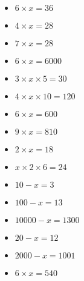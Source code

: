 \documentclass[a4paper,15pt]{exam}
\begin{document}
\begin{multicols}{2}
\begin{itemize}

\item $ 6 \times x = 36 $ 
\item $ 4 \times x = 28 $ 
\item $ 7 \times x = 28 $ 
\item $ 6 \times x = 6000 $ 
\item $ 3 \times x \times 5 = 30 $ 
\item $ 4 \times x \times 10 = 120 $
\item $ 6 \times x = 600 $
\item $ 9 \times x = 810 $
\item $ 2 \times x = 18 $
\item $ x \times 2 \times 6  = 24 $
\item $ 10 - x = 3 $
\item $ 100 - x = 13 $
\item $ 10000 - x = 1300 $
\item $ 20 - x = 12 $
\item $ 2000 - x = 1001 $
\item $ 6 \times x = 540 $

\end{itemize}
\end{multicols}
\end{document}
